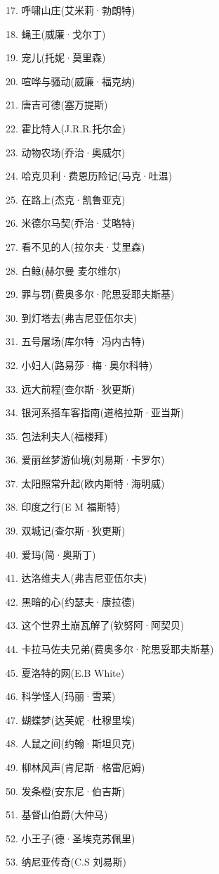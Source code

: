 \documentclass[UTF8]{../../RepresentationUniverse}
\begin{document}
17. 呼啸山庄(艾米莉·勃朗特) 

18. 蝇王(威廉·戈尔丁) 

19. 宠儿(托妮·莫里森) 

20. 喧哗与骚动(威廉·福克纳) 

21. 唐吉可德(塞万提斯) 

22. 霍比特人(J.R.R.托尔金) 

23. 动物农场(乔治·奥威尔) 

24. 哈克贝利·费恩历险记(马克·吐温) 

25. 在路上(杰克·凯鲁亚克) 

26. 米德尔马契(乔治·艾略特) 

27. 看不见的人(拉尔夫·艾里森) 

28. 白鲸(赫尔曼 麦尔维尔) 

29. 罪与罚(费奥多尔·陀思妥耶夫斯基) 

30. 到灯塔去(弗吉尼亚伍尔夫) 

31. 五号屠场(库尔特·冯内古特) 

32. 小妇人(路易莎·梅·奥尔科特) 

33. 远大前程(查尔斯·狄更斯) 

34. 银河系搭车客指南(道格拉斯·亚当斯) 

35. 包法利夫人(福楼拜) 

36. 爱丽丝梦游仙境(刘易斯·卡罗尔) 

37. 太阳照常升起(欧内斯特·海明威) 

38. 印度之行(E M 福斯特) 

39. 双城记(查尔斯·狄更斯) 

40. 爱玛(简·奥斯丁) 

41. 达洛维夫人(弗吉尼亚伍尔夫) 

42. 黑暗的心(约瑟夫·康拉德) 

43. 这个世界土崩瓦解了(钦努阿·阿契贝) 

44. 卡拉马佐夫兄弟(费奥多尔·陀思妥耶夫斯基) 

45. 夏洛特的网(E.B White) 

46. 科学怪人(玛丽·雪莱) 

47. 蝴蝶梦(达芙妮·杜穆里埃) 

48. 人鼠之间(约翰·斯坦贝克) 

49. 柳林风声(肯尼斯·格雷厄姆) 

50. 发条橙(安东尼·伯吉斯) 

51. 基督山伯爵(大仲马) 

52. 小王子(德·圣埃克苏佩里) 

53. 纳尼亚传奇(C.S 刘易斯) 
\end{document}
